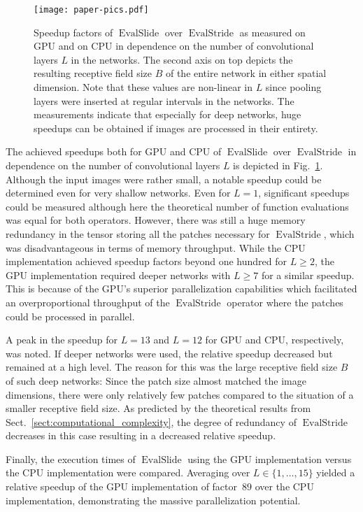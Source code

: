 \documentclass[journal]{IEEEtran}
\newcommand{\discint}[2]{\{#1,\dotsc,#2\}}
\newcommand{\inint}[2]{\in\discint{#1}{#2}}
\DeclareMathOperator{\EvalStride}{EvalStride}
\DeclareMathOperator{\EvalSlide}{EvalSlide}
\begin{document}
\begin{figure}[t]
  \centering
  \texttt{[image: paper-pics.pdf]}
  \caption{Speedup factors of $\EvalSlide$ over $\EvalStride$ as measured on GPU and on CPU in dependence on the number of convolutional layers $L$ in the networks.
    The second axis on top depicts the resulting receptive field size $B$ of the entire network in either spatial dimension.
    Note that these values are non-linear in $L$ since pooling layers were inserted at regular intervals in the networks.
    The measurements indicate that especially for deep networks, huge speedups can be obtained if images are processed in their entirety.}
  \label{fig:eval-withpool}
\end{figure}

The achieved speedups both for GPU and CPU of $\EvalSlide$ over $\EvalStride$ in dependence on the number of convolutional layers $L$ is depicted in Fig.~\ref{fig:eval-withpool}.
Although the input images were rather small, a notable speedup could be determined even for very shallow networks.
Even for $L = 1$, significant speedups could be measured although here the theoretical number of function evaluations was equal for both operators.
However, there was still a huge memory redundancy in the tensor storing all the patches necessary for $\EvalStride$, which was disadvantageous in terms of memory throughput.
While the CPU implementation achieved speedup factors beyond one hundred for $L\geq 2$, the GPU implementation required deeper networks with $L\geq 7$ for a similar speedup.
This is because of the GPU's superior parallelization capabilities which facilitated an overproportional throughput of the $\EvalStride$ operator where the patches could be processed in parallel.

A peak in the speedup for $L = 13$ and $L = 12$ for GPU and CPU, respectively, was noted.
If deeper networks were used, the relative speedup decreased but remained at a high level.
The reason for this was the large receptive field size $B$ of such deep networks:
Since the patch size almost matched the image dimensions, there were only relatively few patches compared to the situation of a smaller receptive field size.
As predicted by the theoretical results from Sect.~\ref{sect:computational_complexity}, the degree of redundancy of $\EvalStride$ decreases in this case resulting in a decreased relative speedup.

Finally, the execution times of $\EvalSlide$ using the GPU implementation versus the CPU implementation were compared.
Averaging over $L\inint{1}{15}$ yielded a relative speedup of the GPU implementation of factor~$89$ over the CPU implementation, demonstrating the massive parallelization potential.
\end{document}
